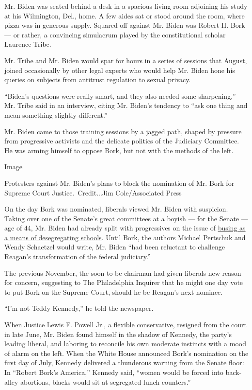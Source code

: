 Mr. Biden was seated behind a desk in a spacious living room adjoining
his study at his Wilmington, Del., home. A few aides sat or stood around
the room, where pizza was in generous supply. Squared off against Mr.
Biden was Robert H. Bork --- or rather, a convincing simulacrum played
by the constitutional scholar Laurence Tribe.

Mr. Tribe and Mr. Biden would spar for hours in a series of sessions
that August, joined occasionally by other legal experts who would help
Mr. Biden hone his queries on subjects from antitrust regulation to
sexual privacy.

``Biden's questions were really smart, and they also needed some
sharpening,'' Mr. Tribe said in an interview, citing Mr. Biden's
tendency to ``ask one thing and mean something slightly different.''

Mr. Biden came to those training sessions by a jagged path, shaped by
pressure from progressive activists and the delicate politics of the
Judiciary Committee. He was arming himself to oppose Bork, but not with
the methods of the left.

Image

Protesters against Mr. Biden's plans to block the nomination of Mr. Bork
for Supreme Court Justice.~Credit...Jim Cole/Associated Press

On the day Bork was nominated, liberals viewed Mr. Biden with suspicion.
Taking over one of the Senate's great committees at a boyish --- for the
Senate --- age of 44, Mr. Biden had already split with progressives on
the issue of
\href{https://www.nytimes.com/2019/06/21/us/politics/joe-biden-james-eastland.html}{busing
as a means of desegregating schools}. Until Bork, the authors Michael
Pertschuk and Wendy Schaetzel would write, Mr. Biden ``had been
reluctant to challenge Reagan's transformation of the federal
judiciary.''

The previous November, the soon-to-be chairman had given liberals new
reason for concern, suggesting to The Philadelphia Inquirer that he
might one day vote to put Bork on the Supreme Court, should he be
Reagan's next nominee.

``I'm not Teddy Kennedy,'' he told the newspaper.

When
\href{https://www.nytimes.com/1998/08/26/us/lewis-powell-crucial-centrist-justice-dies-at-90.html}{Justice
Lewis F. Powell Jr.}, a flexible conservative, resigned from the court
in late June, Mr. Biden found himself in the shadow of Kennedy, the
party's leading liberal, and laboring to reconcile his own moderate
instincts with a mood of alarm on the left. When the White House
announced Bork's nomination on the first day of July, Kennedy delivered
a thunderous warning from the Senate floor: In ``Robert Bork's
America,'' Kennedy said, ``women would be forced into back-alley
abortions, blacks would sit at segregated lunch counters.''

